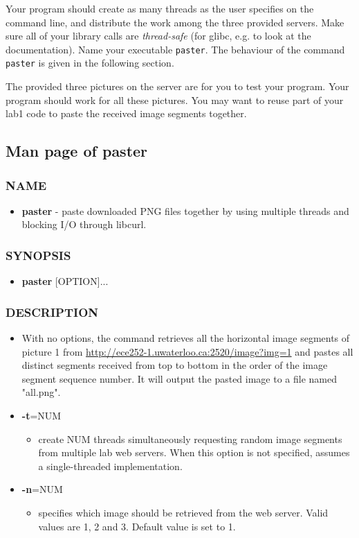 Your program should create as many threads as the user specifies on the command line, and distribute the work among the three provided servers. Make sure all of your library  calls are {\em thread-safe} (for glibc, e.g.  to look at the documentation). Name your executable \verb+paster+. The behaviour of the command \verb+paster+ is given in the following section.

The provided three pictures on the server are for you to test your program. Your program should work for all these pictures. You may want to reuse part of your lab1 code to paste the received image segments together. 

\subsection{Man page of paster}
\label{sec:man_paster_par}

\subsubsection*{NAME}
\begin{itemize}
    \item[]{\bf paster} - paste downloaded PNG files together
        by using multiple threads and blocking I/O through libcurl.
\end{itemize}

\subsubsection*{SYNOPSIS}

\begin{itemize}
\item []{\bf paster} [OPTION]...
\end{itemize}

\subsubsection*{DESCRIPTION}

\begin{itemize}
\item []
  With no options, the command retrieves all the horizontal image segments of picture 1 from \url{http://ece252-1.uwaterloo.ca:2520/image?img=1} and pastes all distinct segments received from top to bottom in the order of the image segment sequence number. It will output the pasted image to a file named "all.png".
\item[] {\bf -t}=NUM
  \begin{itemize}
  \item[] create NUM threads simultaneously requesting random image segments from multiple lab web servers. When this option is not specified, assumes a single-threaded implementation.
  \end{itemize}
\item[] {\bf -n}=NUM
  \begin{itemize}
  \item[] specifies which image should be retrieved from the web server. Valid values are 1, 2 and 3. Default value is set to 1.
  \end{itemize}
\end{itemize}
